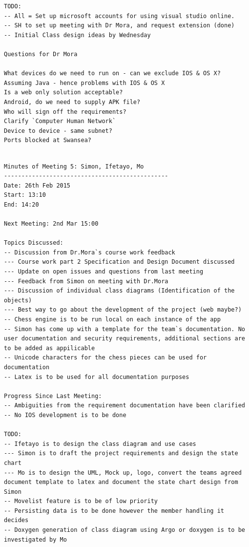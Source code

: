 \documentclass[a4paper,10pt]{article}
\begin{document}
\begin{appendices}
\begin{lstlisting}[frame=single,caption=Meeting of 23/2/15,label=minutes4]
TODO:
-- All = Set up microsoft accounts for using visual studio online.
-- SH to set up meeting with Dr Mora, and request extension (done)
-- Initial Class design ideas by Wednesday

Questions for Dr Mora

What devices do we need to run on - can we exclude IOS & OS X?
Assuming Java - hence problems with IOS & OS X
Is a web only solution acceptable?
Android, do we need to supply APK file?
Who will sign off the requirements?
Clarify `Computer Human Network`
Device to device - same subnet?
Ports blocked at Swansea?

\end{lstlisting}

\begin{lstlisting}[frame=single,caption=Meeting of 26/2/15,label=minutes5]

Minutes of Meeting 5: Simon, Ifetayo, Mo
-----------------------------------------------
Date: 26th Feb 2015
Start: 13:10
End: 14:20

Next Meeting: 2nd Mar 15:00

Topics Discussed:
-- Discussion from Dr.Mora`s course work feedback
--- Course work part 2 Specification and Design Document discussed 
--- Update on open issues and questions from last meeting
--- Feedback from Simon on meeting with Dr.Mora
--- Discussion of individual class diagrams (Identification of the objects)
--- Best way to go about the development of the project (web maybe?)
-- Chess engine is to be run local on each instance of the app
-- Simon has come up with a template for the team`s documentation. No user documentation and security requirements, additional sections are to be added as appilicable
-- Unicode characters for the chess pieces can be used for documentation
-- Latex is to be used for all documentation purposes

Progress Since Last Meeting:
-- Ambiguities from the requirement documentation have been clarified
-- No IOS development is to be done

TODO:
-- Ifetayo is to design the class diagram and use cases
--- Simon is to draft the project requirements and design the state chart
--- Mo is to design the UML, Mock up, logo, convert the teams agreed document template to latex and document the state chart design from Simon
-- Movelist feature is to be of low priority
-- Persisting data is to be done however the member handling it decides
-- Doxygen generation of class diagram using Argo or doxygen is to be investigated by Mo



\end{lstlisting}
\end{appendices}
\end{document}
